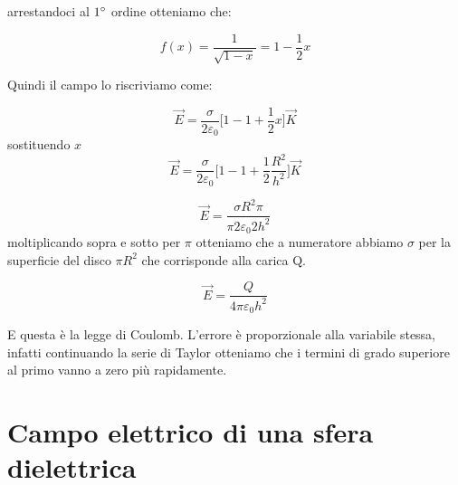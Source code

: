 arrestandoci al $1 ^\circ$ ordine otteniamo che:

\begin{equation*}
    f(x) = \frac{1}{\sqrt{1 - x}} = 1 - \frac{1}{2}x
\end{equation*}

Quindi il campo lo riscriviamo come:

\begin{equation*}
    \vec{E} = \frac{\sigma}{2\varepsilon_0 } \Biggl[ 1 - 1 + \frac{1}{2}x\Biggl]\vec{K}
\end{equation*}
sostituendo $x$
\begin{equation*}
    \vec{E} = \frac{\sigma}{2\varepsilon_0} \Biggl[ 1 - 1 + \frac{1}{2}\frac{R^2}{h^2}\Biggl]\vec{K}
\end{equation*}

\begin{equation*}
    \vec{E} = \frac{\sigma R^2 \pi}{ \pi 2\varepsilon_0 2 h^2}
\end{equation*}
moltiplicando sopra e sotto per $\pi$ otteniamo che a numeratore abbiamo $\sigma$ per la superficie del disco $\pi R^2$ che corrisponde alla carica Q.

\begin{equation*}
    \vec{E} = \frac{Q}{ 4 \pi \varepsilon_0  h^2}
\end{equation*}

E questa è la legge di Coulomb.
L'errore è proporzionale alla variabile stessa, infatti continuando la serie di Taylor otteniamo che i termini di grado superiore al primo vanno a zero più rapidamente.


\section{Campo elettrico di una sfera dielettrica}

